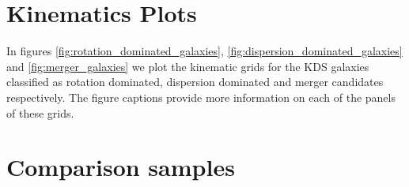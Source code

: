 \documentclass[fleqn,usenatbib]{mn2e}
\begin{document}
\clearpage 

%

\clearpage



\appendix

\section{Kinematics Plots}\label{app:kinematics_plots}
In figures \ref{fig:rotation_dominated_galaxies}, \ref{fig:dispersion_dominated_galaxies} and \ref{fig:merger_galaxies} we plot the kinematic grids for the KDS galaxies classified as rotation dominated, dispersion dominated and merger candidates respectively.
The figure captions provide more information on each of the panels of these grids.

\section{Comparison samples}\label{app:comparison_samples}
\end{document}

